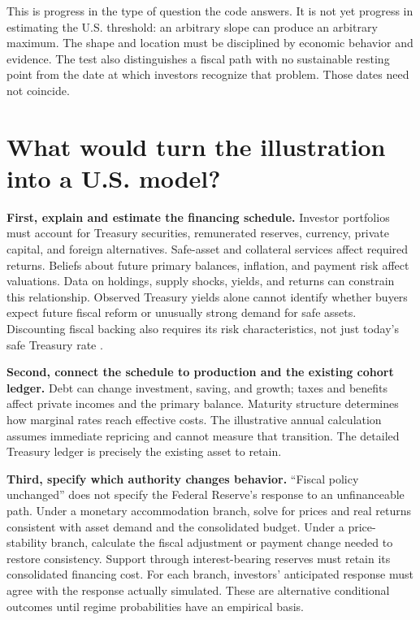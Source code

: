 \documentclass[11pt]{article}
\begin{document}
This is progress in the type of question the code answers. It is not yet progress in
estimating the U.S. threshold: an arbitrary slope can produce an arbitrary maximum.
The shape and location must be disciplined by economic behavior and evidence. The test
also distinguishes a fiscal path with no sustainable resting point from the date at which
investors recognize that problem. Those dates need not coincide.

\section{What would turn the illustration into a U.S. model?}

\textbf{First, explain and estimate the financing schedule.} Investor portfolios must
account for Treasury securities, remunerated reserves, currency, private capital, and
foreign alternatives. Safe-asset and collateral services affect required returns.
Beliefs about future primary balances, inflation, and payment risk affect valuations.
Data on holdings, supply shocks, yields, and returns can constrain this relationship.
Observed Treasury yields alone cannot identify whether buyers expect future fiscal reform
or unusually strong demand for safe assets. Discounting fiscal backing also requires its
risk characteristics, not just today's safe Treasury rate \cite{fiscalCapacity}.

\textbf{Second, connect the schedule to production and the existing cohort ledger.}
Debt can change investment, saving, and growth; taxes and benefits affect private incomes
and the primary balance. Maturity structure determines how marginal rates reach effective
costs. The illustrative annual calculation assumes immediate repricing and cannot measure
that transition. The detailed Treasury ledger is precisely the existing asset to retain.

\textbf{Third, specify which authority changes behavior.} ``Fiscal policy unchanged''
does not specify the Federal Reserve's response to an unfinanceable path. Under a monetary
accommodation branch, solve for prices and real returns consistent with asset demand and
the consolidated budget. Under a price-stability branch, calculate the fiscal adjustment
or payment change needed to restore consistency. Support through interest-bearing reserves
must retain its consolidated financing cost. For each branch, investors' anticipated
response must agree with the response actually simulated. These are alternative conditional
outcomes until regime probabilities have an empirical basis.
\end{document}
